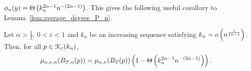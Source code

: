 %

$\phi_n(y) = \Theta\left(k_n^{2\alpha - 1} n^{-(2\alpha - 1)}\right)$. 
This gives the following useful corollary to Lemma~\ref{lem:average_degree_P_n}.

\begin{corollary}\label{cor:average_degree_P_n_K}
Let $\alpha > \frac{1}{2}$, $0 < \varepsilon < 1$ and $k_n$ be an increasing sequence satisfying $k_n = o\left(n^{\frac{1}{2\alpha - 1}}\right)$. Then, for all $p \in {\mathcal K}_{\varepsilon}(k_n)$,
\[
	\mu_{\alpha,\nu ,n}(B_{{\mathcal P},n}(p)) = \mu_{\alpha,\nu}(B_{{\mathcal P}}(p))\left(1 - \Theta\left(k_n^{2\alpha - 1} n^{-(2\alpha - 1)}\right)\right).
\]
\end{corollary}

